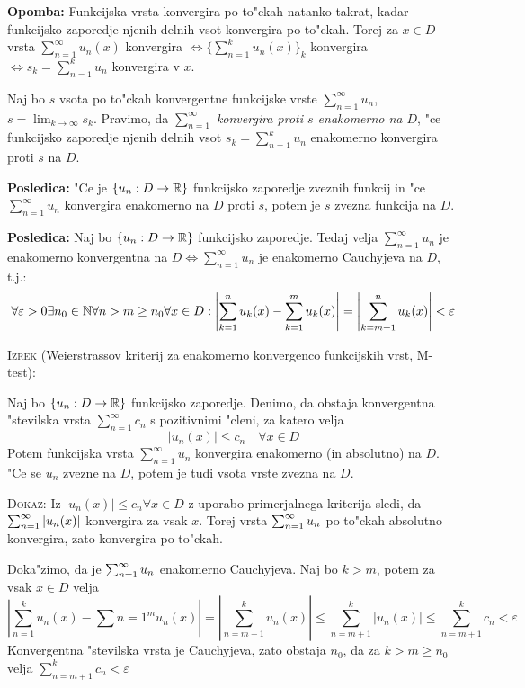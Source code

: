 \textbf{Opomba:} Funkcijska vrsta konvergira po to"ckah natanko takrat, kadar funkcijsko zaporedje njenih delnih vsot konvergira po to"ckah. Torej za $x \in D$ vrsta $\sum_{n=1}^\infty u_n(x)$ konvergira $\iff \{ \sum_{n=1}^k u_n (x) \}_k$ konvergira $\iff s_k = \sum_{n=1}^k u_n$ konvergira v $x$.

Naj bo $s$ vsota po to"ckah konvergentne funkcijske vrste $\sum_{n=1}^\infty u_n$, $s = \lim_{k \to \infty} s_k$. Pravimo, da $\sum_{n=1}^\infty$ \emph{konvergira proti $s$ enakomerno na $D$}, "ce funkcijsko zaporedje njenih delnih vsot $s_k = \sum_{n=1}^k u_n$ enakomerno konvergira proti $s$ na $D$.

\textbf{Posledica:} "Ce je $\{ u_n: D \to \mathbb{R} \}$ funkcijsko zaporedje zveznih funkcij in "ce $\sum_{n=1}^\infty u_n$ konvergira enakomerno na $D$ proti $s$, potem je $s$ zvezna funkcija na $D$.

\textbf{Posledica:} Naj bo $\{ u_n : D \to \mathbb{R} \}$ funkcijsko zaporedje. Tedaj velja $\sum_{n=1}^\infty u_n$ je enakomerno konvergentna na $D \iff \sum_{n=1}^\infty u_n$ je enakomerno Cauchyjeva na $D$, t.j.:
\begin{equation*}
\forall \varepsilon > 0 \exists n_0 \in \mathbb{N} \forall n > m \geq n_0 \forall x \in D: \left| \sum_{k=1}^n u_k(x) - \sum_{k=1}^m u_k(x) \right| = \left| \sum_{k = m+1}^n u_k(x) \right| < \varepsilon
\end{equation*}

\textsc{Izrek} (Weierstrassov kriterij za enakomerno konvergenco funkcijskih vrst, M-test):

Naj bo $\{ u_n : D \to \mathbb{R} \}$ funkcijsko zaporedje. Denimo, da obstaja konvergentna "stevilska vrsta $\sum_{n=1}^\infty c_n$ s pozitivnimi "cleni, za katero velja
\begin{equation*}
|u_n(x)| \leq c_n \quad \forall x \in D
\end{equation*}
Potem funkcijska vrsta $\sum_{n=1}^\infty u_n$ konvergira enakomerno (in absolutno) na $D$. "Ce se $u_n$ zvezne na $D$, potem je tudi vsota vrste zvezna na $D$.

\textsc{Dokaz:} Iz $|u_n(x)| \leq c_n \forall x \in D$ z uporabo primerjalnega kriterija sledi, da $\sum_{n = 1}^{\infty} |u_n(x)|$ konvergira za vsak $x$. Torej vrsta $\sum_{n = 1}^{\infty} u_n$ po to"ckah absolutno konvergira, zato konvergira po to"ckah.

Doka"zimo, da je $\sum_{n = 1}^{\infty} u_n$ enakomerno Cauchyjeva. Naj bo $k > m$, potem za vsak $x \in D$ velja
\begin{equation*}
\left| \sum_{n=1}^ku_n(x) - \sum{n=1}^m u_n(x) \right| = \left| \sum_{n= m+1}^{k} u_n(x) \right| \leq
 \sum_{n = m+1}^k |u_n(x)| \leq \sum_{n = m+1}^k c_n < \varepsilon
\end{equation*}
Konvergentna "stevilska vrsta je Cauchyjeva, zato obstaja $n_0$, da za $k > m \geq n_0$ velja $\sum_{n = m+1}^k c_n < \varepsilon$

